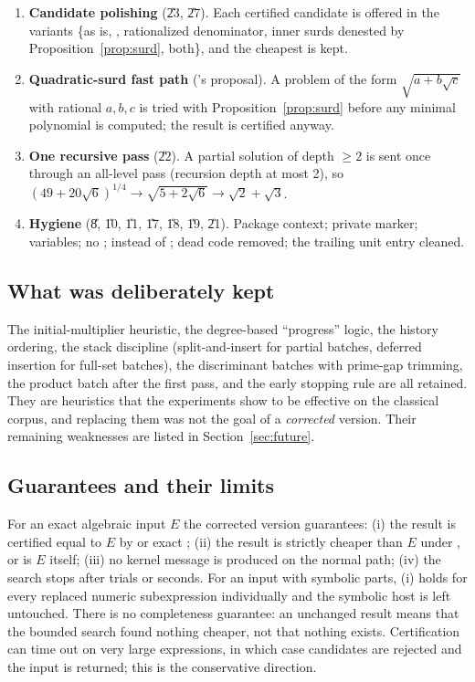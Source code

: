 \begin{enumerate}[label=\arabic*.]
      cheapest of \{input, result, , inner-surd
      variant\} that is certified equal to the input, and never anything more
      expensive than the input.
\item \textbf{Candidate polishing} (\U{23}, \U{27}). Each certified candidate
      is offered in the variants \{as is, , rationalized
      denominator, inner surds denested by Proposition~\ref{prop:surd}, both\},
      and the cheapest is kept.
\item \textbf{Quadratic-surd fast path} (\RIII's proposal). A problem of the
      form $\sqrt{a+b\sqrt c}$ with rational $a,b,c$ is tried with
      Proposition~\ref{prop:surd} before any minimal polynomial is computed;
      the result is certified anyway.
\item \textbf{One recursive pass} (\U{22}). A partial solution of depth $\ge2$
      is sent once through an all-level pass (recursion depth at most 2), so
      $(49+20\sqrt6)^{1/4}\to\sqrt{5+2\sqrt6}\to\sqrt2+\sqrt3$.
\item \textbf{Hygiene} (\U{8}, \U{10}, \U{11}, \U{17}, \U{18}, \U{19}, \U{21}).
      Package context; private marker;  variables; no
      ;  instead of ; dead code
      removed; the trailing unit entry cleaned.
\end{enumerate}

\subsection{What was deliberately kept}
The initial-multiplier heuristic, the degree-based ``progress'' logic, the
history ordering, the stack discipline (split-and-insert for partial batches,
deferred insertion for full-set batches), the discriminant batches with
prime-gap trimming, the product batch after the first pass, and the early
stopping rule are all retained. They are heuristics that the experiments show
to be effective on the classical corpus, and replacing them was not the goal
of a \emph{corrected} version. Their remaining weaknesses are listed in
Section~\ref{sec:future}.

\subsection{Guarantees and their limits}
\label{sec:guarantees}
For an exact algebraic input $E$ the corrected version guarantees: (i) the
result is certified equal to $E$ by  or exact
; (ii) the result is strictly cheaper than $E$ under
, or is $E$ itself; (iii) no kernel message is produced on
the normal path; (iv) the search stops after  trials or
 seconds. For an input with symbolic parts, (i) holds for
every replaced numeric subexpression individually and the symbolic host is
left untouched. There is no completeness guarantee: an unchanged result means
that the bounded search found nothing cheaper, not that nothing exists.
Certification can time out on very large expressions, in which case candidates
are rejected and the input is returned; this is the conservative direction.

